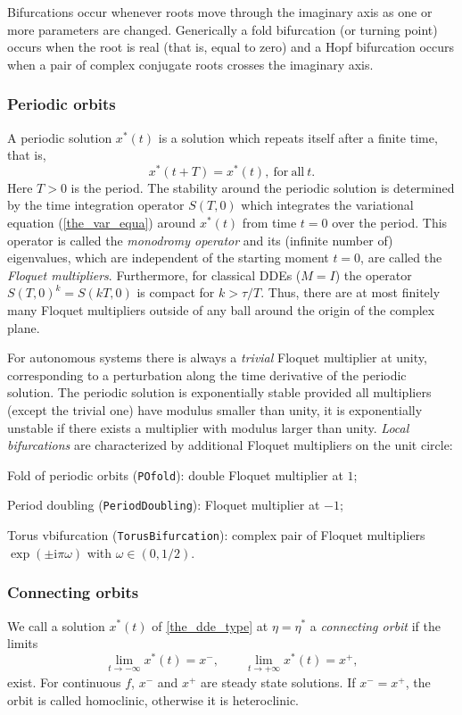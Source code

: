 \documentclass[10pt]{scrartcl}
\newcommand{\define}[1]{\emph{#1}}
\renewcommand{\i}{\mathrm{i}}
\newcommand{\blist}[1]{\mbox{\lstinline!#1!}}
\begin{document}
Bifurcations occur whenever roots move through the imaginary
axis as one or more parameters are changed.
Generically a fold bifurcation (or turning point) occurs when
the root is real (that is, equal to zero) and a 
Hopf bifurcation occurs when a pair of complex conjugate roots crosses the imaginary axis.

\subsubsection{Periodic orbits}
\label{sec:dde:psol}
A periodic solution $x^*(t)$ is a solution which repeats itself after
a finite time, that is,
\[ 
x^*(t+T)=x^*(t),\mathrm{\ for\ all\ }t. 
\]
Here $T>0$ is the period.  The stability around the periodic solution
is determined by the time integration operator $S(T,0)$ which
integrates the variational equation (\ref{the_var_equa}) around
$x^*(t)$ from time $t=0$ over the period.  This operator is called the
\define{monodromy operator} and its (infinite number of) eigenvalues,
which are independent of the starting moment $t=0$, are called the
\define{Floquet multipliers}.  Furthermore, for classical DDEs ($M=I$) the operator
$S(T,0)^k=S(kT,0)$ is compact for $k>\tau/T$. Thus, there are at most finitely
many Floquet multipliers outside of any ball around the origin of the
complex plane.

For autonomous systems there is always a \define{trivial} Floquet
multiplier at unity, corresponding to a perturbation along the time
derivative of the periodic solution. The periodic solution is
exponentially stable provided all multipliers (except the trivial one)
have modulus smaller than unity, it is exponentially unstable if there
exists a multiplier with modulus larger than unity. \emph{Local
  bifurcations} are characterized by additional Floquet multipliers on
the unit circle:
\begin{compactitem}
\item Fold of periodic orbits (\blist{POfold}): double Floquet multiplier at $1$;
\item Period doubling (\blist{PeriodDoubling}): Floquet multiplier at $-1$;
\item Torus vbifurcation (\blist{TorusBifurcation}): complex pair of
  Floquet multipliers $\exp(\pm\i\pi\omega)$ with $\omega\in(0,1/2)$.
\end{compactitem}


\subsubsection{Connecting orbits}
\label{sec:dde:hcli}
We call a solution $x^*(t)$ of \cref{the_dde_type} at $\eta=\eta^*$ a 
\textit{connecting orbit} if the limits 
\begin{equation}
\lim_{t\to -\infty} x^*(t)=x^{-}, \qquad \lim_{t\to +\infty} x^*(t)=x^{+},
\end{equation}
exist.  For continuous $f$, $x^-$ and $x^+$ 
are steady state solutions. 
If $x^-=x^+$, the orbit is called homoclinic, otherwise it is heteroclinic. 
\end{document}
